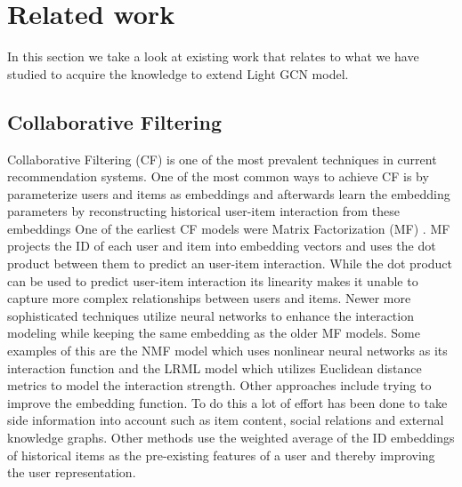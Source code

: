 \section{Related work}
In this section we take a look at existing work that relates to what we have studied to acquire the knowledge to extend Light GCN model.

\subsection{Collaborative Filtering}
Collaborative Filtering (CF) is one of the most prevalent techniques in current recommendation systems\cite{YT_rec,NGCF_2019,Pint_rec,COL_MEM_NET}.
One of the most common ways to achieve CF is by parameterize users and items as embeddings and afterwards learn the embedding parameters by reconstructing historical user-item interaction from these embeddings\cite{NGCF_2019}
One of the earliest CF models were Matrix Factorization (MF) \cite{Matrix-factorization-techniques, BAY_PER_RAN}.
MF  projects the ID of each user and item into embedding vectors and uses the dot product between them to predict an user-item interaction.
While the dot product can be used to predict user-item interaction its linearity makes it unable to capture more complex relationships between users and items.
Newer more sophisticated techniques utilize neural networks to enhance the interaction modeling while keeping the same embedding as the older MF models.
Some examples of this are the NMF model\cite{NEU_COL_FIL} which uses nonlinear neural networks as its interaction function and the LRML model\cite{LAT_REL_MET} which utilizes Euclidean distance metrics to model the interaction strength.
Other approaches include trying to improve the embedding function.
To do this a lot of effort has been done to take side information into account such as item content\cite{ATT_COL_FIL_MUL}, social relations\cite{REC_SOC_USE} and external knowledge graphs\cite{KGAT, KNO_GRA_REC}.
Other methods use the weighted average of the ID embeddings of historical items as the pre-existing features of a user and thereby improving the user representation\cite{SVD_PLUSPLUS,FISM}.
 
